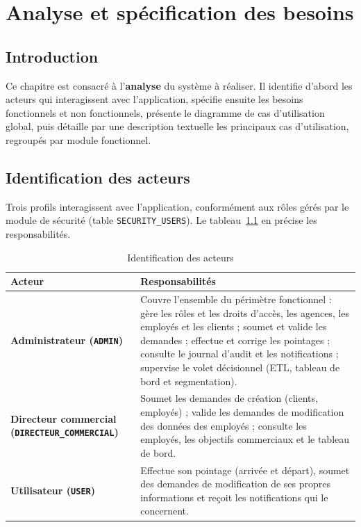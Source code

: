 \chapter{Analyse et spécification des besoins}

\section*{Introduction}
Ce chapitre est consacré à l'\textbf{analyse} du système à réaliser. Il identifie
d'abord les acteurs qui interagissent avec l'application, spécifie ensuite les
besoins fonctionnels et non fonctionnels, présente le diagramme de cas
d'utilisation global, puis détaille par une description textuelle les principaux
cas d'utilisation, regroupés par module fonctionnel.

\section{Identification des acteurs}
Trois profils interagissent avec l'application, conformément aux rôles gérés par
le module de sécurité (table \texttt{SECURITY\_USERS}). Le
tableau~\ref{tab:acteurs} en précise les responsabilités.

\begin{table}[htbp]
\centering
\caption{Identification des acteurs}
\label{tab:acteurs}
\renewcommand{\arraystretch}{1.25}
\begin{tabularx}{\textwidth}{|>{\bfseries}p{4cm}|X|}
\hline
\textmd{\textbf{Acteur}} & \textbf{Responsabilités}\\
\hline
Administrateur (\texttt{ADMIN}) & Couvre l'ensemble du périmètre fonctionnel :
gère les rôles et les droits d'accès, les agences, les employés et les clients ;
soumet et valide les demandes ; effectue et corrige les pointages ; consulte le
journal d'audit et les notifications ; supervise le volet décisionnel (ETL,
tableau de bord et segmentation).\\
\hline
Directeur commercial (\texttt{DIRECTEUR\_COMMERCIAL}) & Soumet les demandes de
création (clients, employés) ; valide les demandes de modification des données
des employés ; consulte les employés, les objectifs commerciaux et le tableau de
bord.\\
\hline
Utilisateur (\texttt{USER}) & Effectue son pointage (arrivée et départ), soumet
des demandes de modification de ses propres informations et reçoit les
notifications qui le concernent.\\
\hline
\end{tabularx}
\end{table}

